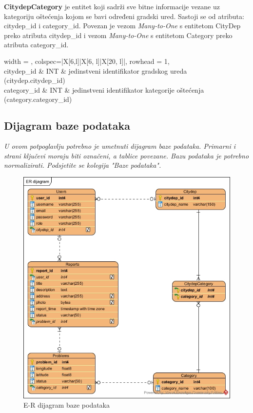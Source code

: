\noindent\textbf{CitydepCategory} je entitet koji sadrži sve bitne informacije vezane uz kategoriju oštećenja kojom se bavi određeni gradski ured.
Sastoji se od atributa: citydep\_id i category\_id. Povezan je vezom \textit{Many-to-One} s entitetom CityDep preko atributa citydep\_id i vezom \textit{Many-to-One} s entitetom Category preko atributa category\_id.

\begin{longtblr}[
	label=none,
	entry=none
	]{
	width = \textwidth,
	colspec={|X[6,l]|X[6, l]|X[20, l]|},
	rowhead = 1,
	} %
	\hline {}                                                              \\ \hline[3pt]
	citydep\_id  & INT & jedinstveni identifikator gradskog ureda (citydep.citydep\_id)         \\ \hline
	category\_id & INT & jedinstveni identifikator kategorije oštećenja (category.category\_id) \\ \hline
\end{longtblr}



\subsection{Dijagram baze podataka}
\textit{ U ovom potpoglavlju potrebno je umetnuti dijagram baze podataka. Primarni i strani ključevi moraju biti označeni, a tablice povezane. Bazu podataka je potrebno normalizirati. Podsjetite se kolegija "Baze podataka".}

\begin{figure}[H]
	\includegraphics[scale=0.725]{slike/ERD-model} %
	\centering
	\caption{E-R dijagram baze podataka}
	\label{fig:ERdijagramBazePodataka}
\end{figure}

